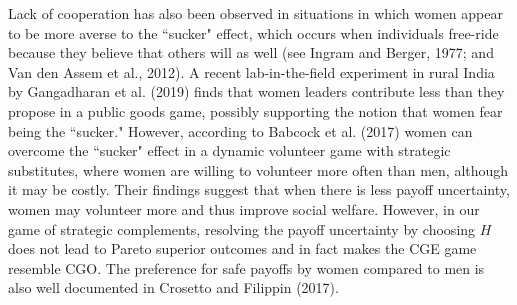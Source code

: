 \documentclass[12pt, letterpaper]{article}
\theoremstyle{plain}
\begin{document}
Lack of cooperation has also been observed in situations in which women appear to be more averse to the ``sucker" effect, which occurs when individuals free-ride because they believe that others will as well (see Ingram and Berger, 1977; and Van den Assem et al., 2012). A recent lab-in-the-field experiment in rural India by Gangadharan et al. (2019) finds that women leaders contribute less than they propose in a public goods game, possibly supporting the notion that women fear being the ``sucker." However, according to Babcock et al. (2017) women can overcome the ``sucker" effect in a dynamic volunteer game with strategic substitutes, where women are willing to volunteer more often than men, although it may be costly. Their findings suggest that when there is less payoff uncertainty, women may volunteer more and thus improve social welfare. However, in our game of strategic complements, resolving the payoff uncertainty by choosing $H$ does not lead to Pareto superior outcomes and in fact makes the CGE game resemble CGO. The preference for safe payoffs by women compared to men is also well documented in Crosetto and Filippin (2017).
\end{document}
